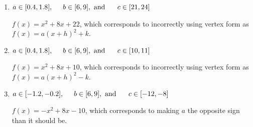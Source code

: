 \documentclass{extbook}[14pt]
\begin{document}
\begin{enumerate}
{\begin{enumerate}[label=\Alph*.]
$f(x)=-x^{2} -8 x -10$, which corresponds to incorrectly using vertex form as $f(x) = a(x+h)^2+k$ AND making $a$ the opposite sign than it should be.
\item \( a \in [0.4, 1.8], \hspace*{5mm} b \in [6, 9], \text{ and } \hspace*{5mm} c \in [21, 24] \)

$f(x)=x^{2} +8 x + 22$, which corresponds to incorrectly using vertex form as $f(x) = a(x+h)^2+k$.
\item \( a \in [0.4, 1.8], \hspace*{5mm} b \in [6, 9], \text{ and } \hspace*{5mm} c \in [10, 11] \)

$f(x)=x^{2} +8 x + 10$, which corresponds to incorrectly using vertex form as $f(x) = a(x+h)^2 - k$.
\item \( a \in [-1.2, -0.2], \hspace*{5mm} b \in [6, 9], \text{ and } \hspace*{5mm} c \in [-12, -8] \)

$f(x)=-x^{2} +8 x -10$, which corresponds to making $a$ the opposite sign than it should be.
\end{enumerate}

}
\end{enumerate}
\end{document}
